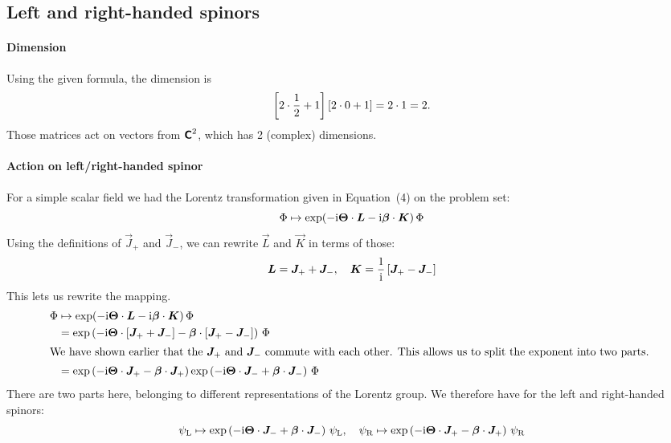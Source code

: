 \documentclass[11pt, english, fleqn, DIV=15, headinclude, BCOR=1cm]{scrartcl}
\begin{document}
\subsection{Left and right-handed spinors}

\paragraph{Dimension}

Using the given formula, the dimension is
\[
    \left[ 2 \cdot \frac12 + 1 \right] [2 \cdot 0 + 1] = 2 \cdot 1 = 2.
\]
Those matrices act on vectors from $\text{\bfseries\sffamily C}^2$, which has 2 (complex) dimensions.

\paragraph{Action on left/right-handed spinor}

For a simple scalar field we had the Lorentz transformation given in
Equation~(4) on the problem set:
\[
    \Phi \mapsto \exp(- \mathrm i \boldsymbol{\Theta} \cdot \boldsymbol{L} - \mathrm i \boldsymbol{\beta} \cdot
    \boldsymbol{K}) \, \Phi
\]
Using the definitions of $\vec J_+$ and $\vec J_-$, we can rewrite $\vec L$ and
$\vec K$ in terms of those:
\[
    \boldsymbol{L} = \boldsymbol{J}_+ + \boldsymbol{J}_-
    ,\quad
    \boldsymbol{K} = \frac1{\mathrm i} \left[ \boldsymbol{J}_+ - \boldsymbol{J}_- \right]
\]
This lets us rewrite the mapping.
\begin{align*}
    \Phi
    &\mapsto
    \exp(- \iup \vec \Theta \cdot \vec L - \iup \vec \beta \cdot
    \vec K) \, \Phi \\
    &= \exp\del{-\iup \vec\Theta\cdot\sbr{\vec J_+ + \vec J_-} - \vec
    \beta\cdot\sbr{\vec J_+ - \vec J_-}} \, \Phi \\
    \intertext{%
        We have shown earlier that the $\vec J_+$ and $\vec J_-$ commute with
        each other. This allows us to split the exponent into two parts.
    }
    &= \exp\del{-\iup \vec\Theta\cdot\vec J_+ - \vec \beta\cdot\vec J_+}
    \exp\del{-\iup \vec\Theta\cdot\vec J_- + \vec \beta\cdot \vec J_-}
    \, \Phi
\end{align*}
There are two parts here, belonging to different representations of the Lorentz
group. We therefore have for the left and right-handed spinors:
\[
    \psi_\text L \mapsto \exp\left( -\mathrm i \boldsymbol{\Theta}\cdot\boldsymbol{J}_- + \boldsymbol{\beta}\cdot \boldsymbol{J}_- \right) \,\psi_\text L
    ,\quad
    \psi_\text R \mapsto \exp\left( -\mathrm i \boldsymbol{\Theta}\cdot\boldsymbol{J}_+ - \boldsymbol{\beta}\cdot\boldsymbol{J}_+ \right) \,\psi_\text R
\]
\end{document}
